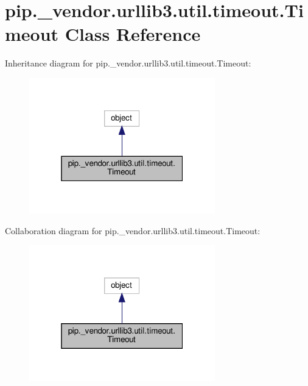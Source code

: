 \hypertarget{classpip_1_1__vendor_1_1urllib3_1_1util_1_1timeout_1_1Timeout}{}\section{pip.\+\_\+vendor.\+urllib3.\+util.\+timeout.\+Timeout Class Reference}
\label{classpip_1_1__vendor_1_1urllib3_1_1util_1_1timeout_1_1Timeout}


Inheritance diagram for pip.\+\_\+vendor.\+urllib3.\+util.\+timeout.\+Timeout\+:
\nopagebreak
\begin{figure}[H]
\begin{center}
\leavevmode
\includegraphics[width=229pt]{classpip_1_1__vendor_1_1urllib3_1_1util_1_1timeout_1_1Timeout__inherit__graph}
\end{center}
\end{figure}


Collaboration diagram for pip.\+\_\+vendor.\+urllib3.\+util.\+timeout.\+Timeout\+:
\nopagebreak
\begin{figure}[H]
\begin{center}
\leavevmode
\includegraphics[width=229pt]{classpip_1_1__vendor_1_1urllib3_1_1util_1_1timeout_1_1Timeout__coll__graph}
\end{center}
\end{figure}

